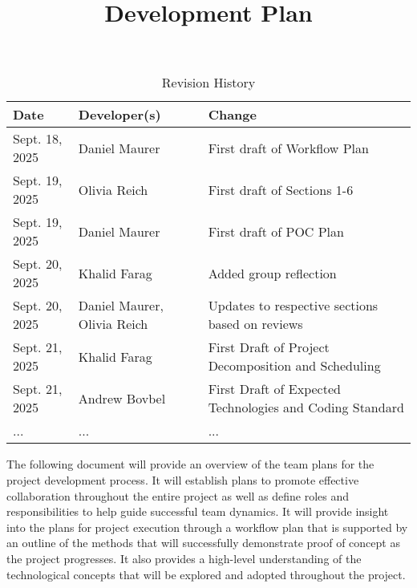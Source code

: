 \documentclass{article}
\title{Development Plan\\\progname}
\author{\authname}
\date{}
\begin{document}
\maketitle

\begin{table}[hp]
\caption{Revision History} \label{TblRevisionHistory}
\begin{tabularx}{\textwidth}{llX}
\toprule
\textbf{Date} & \textbf{Developer(s)} & \textbf{Change}\\
\midrule
Sept. 18, 2025 & Daniel Maurer & First draft of Workflow Plan\\
Sept. 19, 2025 & Olivia Reich & First draft of Sections 1-6\\
Sept. 19, 2025 & Daniel Maurer & First draft of POC Plan\\
Sept. 20, 2025 & Khalid Farag & Added group reflection\\
Sept. 20, 2025 & Daniel Maurer, Olivia Reich & Updates to respective sections based on reviews\\
Sept. 21, 2025 & Khalid Farag & First Draft of Project Decomposition and Scheduling\\
Sept. 21, 2025 & Andrew Bovbel & First Draft of Expected Technologies and Coding Standard\\
... & ... & ...\\
\bottomrule
\end{tabularx}
\end{table}

\newpage{}

\iffalse
\wss{Put your introductory blurb here.  Often the blurb is a brief roadmap of
what is contained in the report.}

\wss{Additional information on the development plan can be found in the
\href{https://gitlab.cas.mcmaster.ca/courses/capstone/-/blob/main/Lectures/L02b_POCAndDevPlan/POCAndDevPlan.pdf?ref_type=heads}
{lecture slides}.}
\fi

The following document will provide an overview of the team plans for the project development process. It will
establish plans to promote effective collaboration throughout the entire project as well as define roles and
responsibilities to help guide successful team dynamics. It will provide insight into the plans for project
execution through a workflow plan that is supported by an outline of the methods that will successfully demonstrate
proof of concept as the project progresses. It also provides a high-level understanding of the technological
concepts that will be explored and adopted throughout the project.
\end{document}
